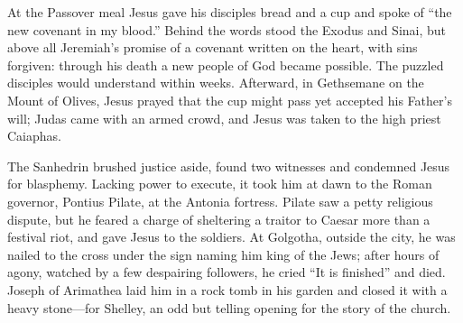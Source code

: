 At the Passover meal Jesus gave his disciples bread and a cup and spoke of ``the new covenant in my
blood.'' Behind the words stood the Exodus and Sinai, but above all Jeremiah's promise of a covenant
written on the heart, with sins forgiven: through his death a new people of God became possible. The
puzzled disciples would understand within weeks. Afterward, in Gethsemane on the Mount of Olives, Jesus
prayed that the cup might pass yet accepted his Father's will; Judas came with an armed crowd, and
Jesus was taken to the high priest Caiaphas.

The Sanhedrin brushed justice aside, found two witnesses and condemned Jesus for blasphemy. Lacking
power to execute, it took him at dawn to the Roman governor, Pontius Pilate, at the Antonia fortress.
Pilate saw a petty religious dispute, but he feared a charge of sheltering a traitor to Caesar more
than a festival riot, and gave Jesus to the soldiers. At Golgotha, outside the city, he was nailed to
the cross under the sign naming him king of the Jews; after hours of agony, watched by a few despairing
followers, he cried ``It is finished'' and died. Joseph of Arimathea laid him in a rock tomb in his
garden and closed it with a heavy stone---for Shelley, an odd but telling opening for the story of the church.

\begin{keyfacts}
\end{keyfacts}
